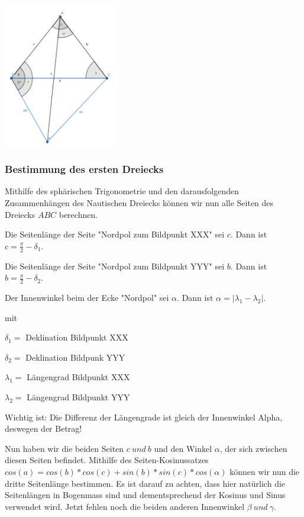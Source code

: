 \documentclass[12pt]{scrartcl}
\begin{document}
	\begin{center}
		\includegraphics[width=5cm]{Bilder/dreieck.png}
	\end{center}	


\subsubsection{Bestimmung des ersten Dreiecks}
 Mithilfe des sphärischen Trigonometrie und den darausfolgenden Zusammenhängen des Nautischen Dreiecks können wir nun alle Seiten des Dreiecks $ABC$ berechnen.
 
 Die Seitenlänge der Seite "Nordpol zum Bildpunkt XXX" sei $c$. 
 Dann ist $c = \frac{\pi}{2} - \delta_1$. 
 
 Die Seitenlänge der Seite "Nordpol zum Bildpunkt YYY" sei $b$.
 Dann ist $b = \frac{\pi}{2} - \delta_2$. 
 
 Der Innenwinkel beim der Ecke "Nordpol" sei $\alpha$.
 Dann ist $ \alpha = |\lambda_1 - \lambda_2|$. 
  
mit 
 
 $\delta_1 =$ Deklination Bildpunkt XXX
 
$\delta_2 =$ Deklination Bildpunk YYY 

$\lambda_1 =$ Längengrad Bildpunkt XXX

$\lambda_2 =$ Längengrad Bildpunkt YYY

 Wichtig ist: Die Differenz der Längengrade ist gleich der Innenwinkel Alpha, deswegen der Betrag!

Nun haben wir die beiden Seiten $c\ und\ b$ und den Winkel $\alpha$, der sich zwischen diesen Seiten befindet. 
Mithilfe des Seiten-Kosinussatzes $cos(a) = cos(b)*cos(c) + sin(b) * sin(c)*cos(\alpha)$ können wir nun die dritte Seitenlänge bestimmen. 
Es ist darauf zu achten, dass hier natürlich die Seitenlängen in Bogenmass sind und dementsprechend der Kosinus und Sinus verwendet wird. 
Jetzt fehlen noch die beiden anderen Innenwinkel $\beta \ und\ \gamma$.
\end{document}
